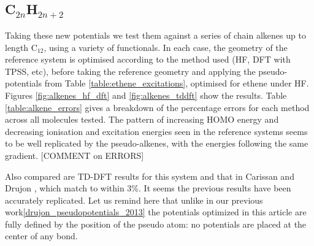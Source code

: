 \documentclass[journal=jctcce,manuscript=article]{achemso}
\begin{document}
\subsection{C\(_{2n}\)H\(_{2n+2}\)}

Taking these new potentials we test them against a series of chain alkenes up to length C\(_{12}\), using a variety of functionals. In each case, the geometry of the reference system is optimised according to the method used (HF, DFT with TPSS, etc), before taking the reference geometry and applying the pseudo-potentials from Table \ref{table:ethene_excitations}, optimised for ethene under HF. Figures \ref{fig:alkenes_hf_dft} and \ref{fig:alkenes_tddft} show the results. Table \ref{table:alkene_errors} gives a breakdown of the percentage errors for each method across all molecules tested. The pattern of increasing HOMO energy and decreasing ionisation and excitation energies seen in the reference systems seems to be well replicated by the pseudo-alkenes, with the energies following the same gradient. [COMMENT on ERRORS]

Also compared are TD-DFT results for this system and that in Carissan and Drujon \cite{drujon_pseudopotentials_2013}, which match to within 3\%. It seems the previous results have been accurately replicated.
Let us remind here that unlike in our previous work\ref{drujon_pseudopotentials_2013}
the potentials optimized in this article are fully defined by the position
of the pseudo atom: no potentials are placed at the center of any bond.
\end{document}
